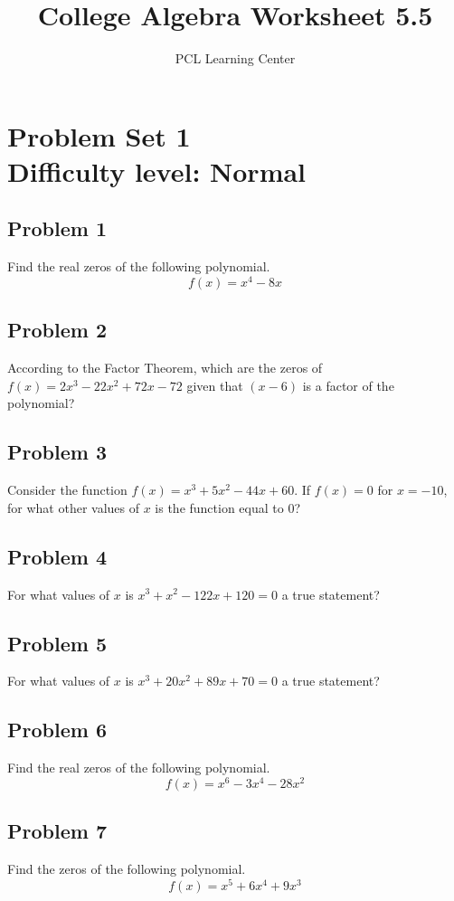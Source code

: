 \documentclass[12pt]{article}
\title{College Algebra Worksheet 5.5}
\author{PCL Learning Center}
\date{}
\begin{document}
\maketitle

\section*{Problem Set 1\\Difficulty level: Normal}
\subsection*{Problem 1}
Find the real zeros of the following polynomial.
\[f(x)=x^4-8x\]

\subsection*{Problem 2}
According to the Factor Theorem, which are the zeros of \(f(x)=2x^3-22x^2+72x-72\) given that \((x-6)\) is a factor of the polynomial?

\subsection*{Problem 3}
Consider the function \(f(x)=x^3+5x^2-44x+60\). If \(f(x)=0\) for \(x=-10\), for what other values of \(x\) is the function equal to \(0\)?

\subsection*{Problem 4}
For what values of \(x\) is \(x^3+x^2-122x+120=0\) a true statement?

\subsection*{Problem 5}
For what values of \(x\) is \(x^3+20x^2+89x+70=0\) a true statement?

\subsection*{Problem 6}
Find the real zeros of the following polynomial.
\[f(x)=x^6-3x^4-28x^2\]

\subsection*{Problem 7}
Find the zeros of the following polynomial.
\[f(x)=x^5+6x^4+9x^3\]
\end{document}

